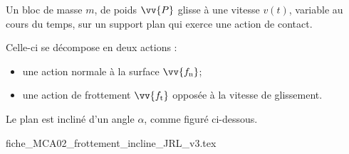 \finEntrainement








\hauteurLargeurCadreReponse		{7mm}{5cm}
\typeEntrainement				{} %
\initialisationEntrainement


Un bloc de masse $m$, de poids $\vv{P}$ glisse à une vitesse $v(t)$, variable au cours du temps, sur un support plan qui exerce une action de contact. 

Celle-ci se décompose en deux actions : 
\begin{itemize}
	\item une action normale à la surface $\vv{f_\text{n}}$;
	\item une action de frottement $\vv{f_\text{t}}$ opposée à la vitesse de glissement.
\end{itemize}

Le plan est incliné d'un angle $\alpha$, comme figuré ci-dessous.
\begin{center}
{fiche_MCA02_frottement_incline_JRL_v3.tex}
\end{center}


